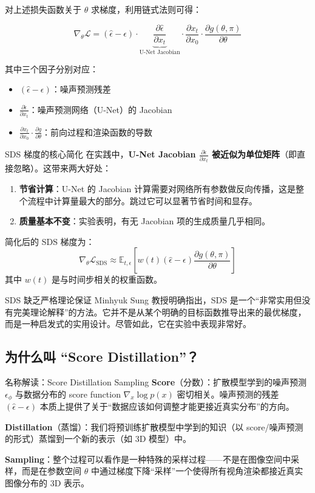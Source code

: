 对上述损失函数关于 $\theta$ 求梯度，利用链式法则可得：

$$
\nabla_\theta \mathcal{L} = (\hat{\epsilon} - \epsilon) \cdot \underbrace{\frac{\partial \hat{\epsilon}}{\partial x_t}}_{\text{U-Net Jacobian}} \cdot \frac{\partial x_t}{\partial x_0} \cdot \frac{\partial g(\theta, \pi)}{\partial \theta}
$$

其中三个因子分别对应：
\begin{itemize}
    \item $(\hat{\epsilon} - \epsilon)$：噪声预测残差
    \item $\frac{\partial \hat{\epsilon}}{\partial x_t}$：噪声预测网络（U-Net）的 Jacobian
    \item $\frac{\partial x_t}{\partial x_0} \cdot \frac{\partial g}{\partial \theta}$：前向过程和渲染函数的导数
\end{itemize}

\begin{importantbox}{SDS 梯度的核心简化}
在实践中，\textbf{U-Net Jacobian $\frac{\partial \hat{\epsilon}}{\partial x_t}$ 被近似为单位矩阵}（即直接忽略）。这带来两大好处：

\begin{enumerate}
    \item \textbf{节省计算}：U-Net 的 Jacobian 计算需要对网络所有参数做反向传播，这是整个流程中计算量最大的部分。跳过它可以显著节省时间和显存。
    \item \textbf{质量基本不变}：实验表明，有无 Jacobian 项的生成质量几乎相同。
\end{enumerate}

简化后的 SDS 梯度为：
$$
\nabla_\theta \mathcal{L}_{\text{SDS}} \approx \mathbb{E}_{t,\epsilon}\left[w(t)(\hat{\epsilon} - \epsilon) \frac{\partial g(\theta, \pi)}{\partial \theta}\right]
$$
其中 $w(t)$ 是与时间步相关的权重函数。
\end{importantbox}

\begin{warningbox}{SDS 缺乏严格理论保证}
Minhyuk Sung 教授明确指出，SDS 是一个``非常实用但没有完美理论解释''的方法。它并不是从某个明确的目标函数推导出来的最优梯度，而是一种启发式的实用设计。尽管如此，它在实验中表现非常好。
\end{warningbox}

\subsection{为什么叫 ``Score Distillation''？}

\begin{knowledgebox}{名称解读：Score Distillation Sampling}
\textbf{Score}（分数）：扩散模型学到的噪声预测 $\epsilon_\phi$ 与数据分布的 score function $\nabla_x \log p(x)$ 密切相关。噪声预测的残差 $(\hat{\epsilon} - \epsilon)$ 本质上提供了关于``数据应该如何调整才能更接近真实分布''的方向。

\textbf{Distillation}（蒸馏）：我们将预训练扩散模型中学到的知识（以 score/噪声预测的形式）蒸馏到一个新的表示（如 3D 模型）中。

\textbf{Sampling}：整个过程可以看作是一种特殊的采样过程——不是在图像空间中采样，而是在参数空间 $\theta$ 中通过梯度下降``采样''一个使得所有视角渲染都接近真实图像分布的 3D 表示。
\end{knowledgebox}

